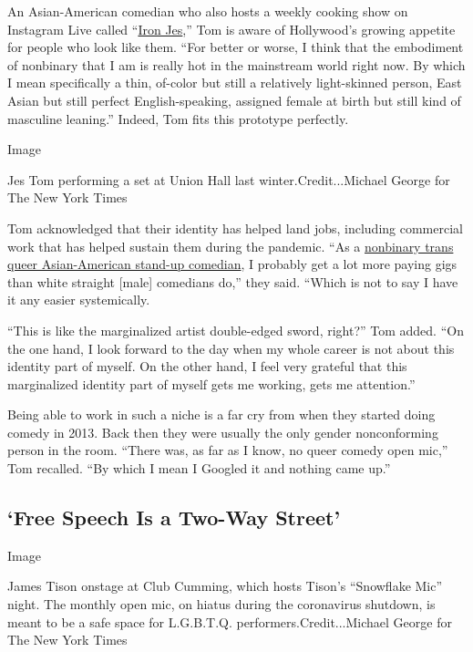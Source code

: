 An Asian-American comedian who also hosts a weekly cooking show on
Instagram Live called
``\href{https://www.instagram.com/p/CBjfafOjRAR/}{Iron Jes},'' Tom is
aware of Hollywood's growing appetite for people who look like them.
``For better or worse, I think that the embodiment of nonbinary that I
am is really hot in the mainstream world right now. By which I mean
specifically a thin, of-color but still a relatively light-skinned
person, East Asian but still perfect English-speaking, assigned female
at birth but still kind of masculine leaning.'' Indeed, Tom fits this
prototype perfectly.

Image

Jes Tom performing a set at Union Hall last winter.Credit...Michael
George for The New York Times

Tom acknowledged that their identity has helped land jobs, including
commercial work that has helped sustain them during the pandemic. ``As a
\href{https://www.youtube.com/watch?v=htU38RhRmto}{nonbinary trans queer
Asian-American stand-up comedian}, I probably get a lot more paying gigs
than white straight {[}male{]} comedians do,'' they said. ``Which is not
to say I have it any easier systemically.

``This is like the marginalized artist double-edged sword, right?'' Tom
added. ``On the one hand, I look forward to the day when my whole career
is not about this identity part of myself. On the other hand, I feel
very grateful that this marginalized identity part of myself gets me
working, gets me attention.''

Being able to work in such a niche is a far cry from when they started
doing comedy in 2013. Back then they were usually the only gender
nonconforming person in the room. ``There was, as far as I know, no
queer comedy open mic,'' Tom recalled. ``By which I mean I Googled it
and nothing came up.''

\hypertarget{free-speech-is-a-two-way-street}{%
\subsection{`Free Speech Is a Two-Way
Street'}\label{free-speech-is-a-two-way-street}}

Image

James Tison onstage at Club Cumming, which hosts Tison's ``Snowflake
Mic'' night. The monthly open mic, on hiatus during the coronavirus
shutdown, is meant to be a safe space for L.G.B.T.Q.
performers.Credit...Michael George for The New York Times

